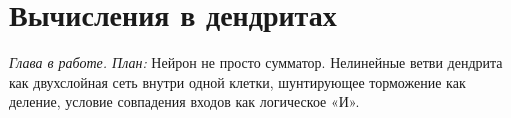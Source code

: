 \chapter{Вычисления в дендритах}
\label{sec:dendritic}

\emph{Глава в работе. План:} Нейрон не просто сумматор. Нелинейные ветви дендрита как двухслойная сеть внутри одной клетки, шунтирующее торможение как деление, условие совпадения входов как логическое «И».
